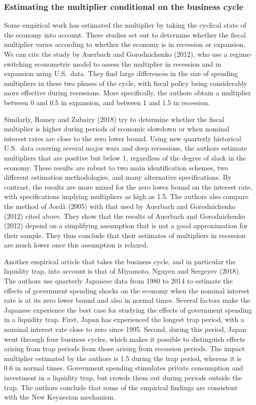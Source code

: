 \documentclass[12pt,letterpaper]{article}
\begin{document}
\subsubsection{Estimating the multiplier conditional on the business cycle}

Some empirical work has estimated the multiplier by taking the cyclical state of the economy into account. These studies set out to determine whether the fiscal multiplier varies according to whether the economy is in recession or expansion. We can cite the study by Auerbach and Gorodnichenko (2012), who use a regime-switching econometric model to assess the multiplier in recession and in expansion using U.S.\ data. They find large differences in the size of spending multipliers in these two phases of the cycle, with fiscal policy being considerably more effective during recessions. More specifically, the authors obtain a multiplier between 0 and 0.5 in expansion, and between 1 and 1.5 in recession.

Similarly, Ramey and Zubairy (2018) try to determine whether the fiscal multiplier is higher during periods of economic slowdown or when nominal interest rates are close to the zero lower bound. Using new quarterly historical U.S.\ data covering several major wars and deep recessions, the authors estimate multipliers that are positive but below 1, regardless of the degree of slack in the economy. These results are robust to two main identification schemes, two different estimation methodologies, and many alternative specifications. By contrast, the results are more mixed for the zero lower bound on the interest rate, with specifications implying multipliers as high as 1.5. The authors also compare the method of Jord\`a (2005) with that used by Auerbach and Gorodnichenko (2012) cited above. They show that the results of Auerbach and Gorodnichenko (2012) depend on a simplifying assumption that is not a good approximation for their sample. They thus conclude that their estimates of multipliers in recession are much lower once this assumption is relaxed.

Another empirical article that takes the business cycle, and in particular the liquidity trap, into account is that of Miyamoto, Nguyen and Sergeyev (2018). The authors use quarterly Japanese data from 1980 to 2014 to estimate the effects of government spending shocks on the economy when the nominal interest rate is at its zero lower bound and also in normal times. Several factors make the Japanese experience the best case for studying the effects of government spending in a liquidity trap. First, Japan has experienced the longest trap period, with a nominal interest rate close to zero since 1995. Second, during this period, Japan went through four business cycles, which makes it possible to distinguish effects arising from trap periods from those arising from recession periods. The impact multiplier estimated by the authors is 1.5 during the trap period, whereas it is 0.6 in normal times. Government spending stimulates private consumption and investment in a liquidity trap, but crowds them out during periods outside the trap. The authors conclude that some of the empirical findings are consistent with the New Keynesian mechanism.
\end{document}
